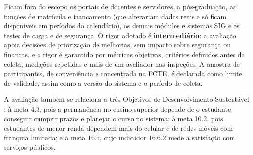 Ficam fora do escopo os portais de docentes e servidores, a pós-graduação, as funções de matrícula e trancamento (que alterariam dados reais e só ficam disponíveis em períodos do calendário), os demais módulos e sistemas SIG e os testes de carga e de segurança. O rigor adotado é \textbf{intermediário}: a avaliação apoia decisões de priorização de melhorias, sem impacto sobre segurança ou finanças, e o rigor é garantido por métricas objetivas, critérios definidos antes da coleta, medições repetidas e mais de um avaliador nas inspeções. A amostra de participantes, de conveniência e concentrada na FCTE, é declarada como limite de validade, assim como a versão do sistema e o período de coleta.

A avaliação também se relaciona a três Objetivos de Desenvolvimento Sustentável \cite{onu2015,ipea2018}: à meta 4.3, pois a permanência no ensino superior depende de o estudante conseguir cumprir prazos e planejar o curso no sistema; à meta 10.2, pois estudantes de menor renda dependem mais do celular e de redes móveis com franquia limitada; e à meta 16.6, cujo indicador 16.6.2 mede a satisfação com serviços públicos.
